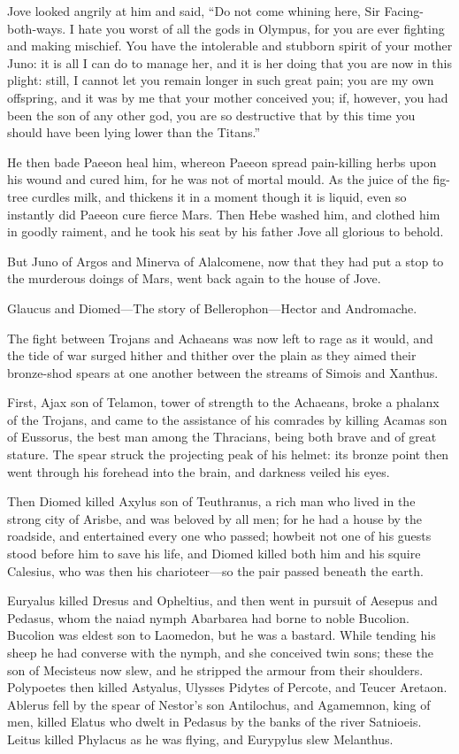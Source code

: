 Jove looked angrily at him and said, “Do not come whining here, Sir
Facing-both-ways. I hate you worst of all the gods in Olympus, for you are
ever fighting and making mischief. You have the intolerable and stubborn
spirit of your mother Juno: it is all I can do to manage her, and it is
her doing that you are now in this plight: still, I cannot let you remain
longer in such great pain; you are my own offspring, and it was by me that
your mother conceived you; if, however, you had been the son of any other
god, you are so destructive that by this time you should have been lying
lower than the Titans.”

He then bade Paeeon heal him, whereon Paeeon spread pain-killing herbs
upon his wound and cured him, for he was not of mortal mould. As the juice
of the fig-tree curdles milk, and thickens it in a moment though it is
liquid, even so instantly did Paeeon cure fierce Mars. Then Hebe washed
him, and clothed him in goodly raiment, and he took his seat by his father
Jove all glorious to behold.

But Juno of Argos and Minerva of Alalcomene, now that they had put a stop
to the murderous doings of Mars, went back again to the house of Jove.


Glaucus and Diomed—The story of Bellerophon—Hector and
Andromache.

The fight between Trojans and Achaeans was now left to rage as it would,
and the tide of war surged hither and thither over the plain as they aimed
their bronze-shod spears at one another between the streams of Simois and
Xanthus.

First, Ajax son of Telamon, tower of strength to the Achaeans, broke a
phalanx of the Trojans, and came to the assistance of his comrades by
killing Acamas son of Eussorus, the best man among the Thracians, being
both brave and of great stature. The spear struck the projecting peak of
his helmet: its bronze point then went through his forehead into the
brain, and darkness veiled his eyes.

Then Diomed killed Axylus son of Teuthranus, a rich man who lived in the
strong city of Arisbe, and was beloved by all men; for he had a house by
the roadside, and entertained every one who passed; howbeit not one of his
guests stood before him to save his life, and Diomed killed both him and
his squire Calesius, who was then his charioteer—so the pair passed
beneath the earth.

Euryalus killed Dresus and Opheltius, and then went in pursuit of Aesepus
and Pedasus, whom the naiad nymph Abarbarea had borne to noble Bucolion.
Bucolion was eldest son to Laomedon, but he was a bastard. While tending
his sheep he had converse with the nymph, and she conceived twin sons;
these the son of Mecisteus now slew, and he stripped the armour from their
shoulders. Polypoetes then killed Astyalus, Ulysses Pidytes of Percote,
and Teucer Aretaon. Ablerus fell by the spear of Nestor’s son Antilochus,
and Agamemnon, king of men, killed Elatus who dwelt in Pedasus by the
banks of the river Satnioeis. Leitus killed Phylacus as he was flying, and
Eurypylus slew Melanthus.

